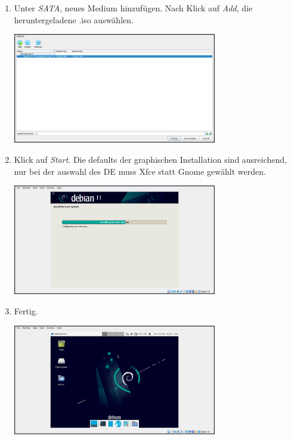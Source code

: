 \documentclass{article}
\begin{document}
\begin{enumerate}
    \item Unter \emph{SATA}, neues Medium hinzufügen. Nach Klick auf \emph{Add}, die heruntergeladene .iso auswählen.
    \begin{center}
        \includegraphics[width=0.7\textwidth]{06.png}
    \end{center}

    \item Klick auf \emph{Start}. Die defaults der graphischen Installation sind ausreichend, nur bei der auswahl des DE muss Xfce statt Gnome gewählt werden.
    \begin{center}
        \includegraphics[width=0.7\textwidth]{08.png}
    \end{center}

    \item Fertig.
    \begin{center}
        \includegraphics[width=0.7\textwidth]{09.png}
    \end{center}
\end{enumerate}
\end{document}
